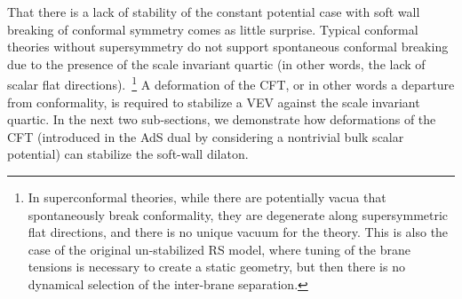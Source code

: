 \documentclass[12pt]{article}
\begin{document}
That there is a lack of stability of the constant potential case with soft wall breaking of conformal symmetry comes as little surprise.  Typical conformal theories without supersymmetry do not support spontaneous conformal breaking due to the presence of the scale invariant quartic (in other words, the lack of scalar flat directions).~\footnote{In superconformal theories, while there are potentially vacua that spontaneously break conformality, they are degenerate along supersymmetric flat directions, and there is no unique vacuum for the theory.  This is also the case of the original un-stabilized RS model, where tuning of the brane tensions is necessary to create a static geometry, but then there is no dynamical selection of the inter-brane separation.} A deformation of the CFT, or in other words a departure from conformality, is required to stabilize a VEV against the scale invariant quartic.  In the next two sub-sections, we demonstrate how deformations of the CFT (introduced in the AdS dual by considering a nontrivial bulk scalar potential) can stabilize the soft-wall dilaton.

\end{document}
